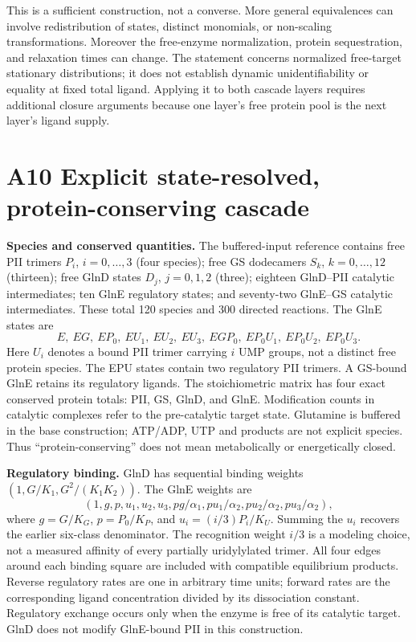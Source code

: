 \documentclass[11pt]{article}
\begin{document}
This is a sufficient construction, not a converse. More general equivalences can involve redistribution of states, distinct monomials, or non-scaling transformations. Moreover the free-enzyme normalization, protein sequestration, and relaxation times can change. The statement concerns normalized free-target stationary distributions; it does not establish dynamic unidentifiability or equality at fixed total ligand. Applying it to both cascade layers requires additional closure arguments because one layer's free protein pool is the next layer's ligand supply.

\section*{A10 Explicit state-resolved, protein-conserving cascade}

\textbf{Species and conserved quantities.} The buffered-input reference contains free PII trimers $P_i$, $i=0,\ldots,3$ (four species); free GS dodecamers $S_k$, $k=0,\ldots,12$ (thirteen); free GlnD states $D_j$, $j=0,1,2$ (three); eighteen GlnD--PII catalytic intermediates; ten GlnE regulatory states; and seventy-two GlnE--GS catalytic intermediates. These total 120 species and 300 directed reactions. The GlnE states are
\[
 E,\ EG,\ EP_0,\ EU_1,\ EU_2,\ EU_3,\ EGP_0,\ EP_0U_1,\ EP_0U_2,\ EP_0U_3.
\]
Here $U_i$ denotes a bound PII trimer carrying $i$ UMP groups, not a distinct free protein species. The EPU states contain two regulatory PII trimers. A GS-bound GlnE retains its regulatory ligands. The stoichiometric matrix has four exact conserved protein totals: PII, GS, GlnD, and GlnE. Modification counts in catalytic complexes refer to the pre-catalytic target state. Glutamine is buffered in the base construction; ATP/ADP, UTP and products are not explicit species. Thus ``protein-conserving'' does not mean metabolically or energetically closed.

\textbf{Regulatory binding.} GlnD has sequential binding weights $(1,G/K_1,G^2/(K_1K_2))$. The GlnE weights are
\[
 (1,g,p,u_1,u_2,u_3,pg/\alpha_1,pu_1/\alpha_2,pu_2/\alpha_2,pu_3/\alpha_2),
\]
where $g=G/K_G$, $p=P_0/K_P$, and $u_i=(i/3)P_i/K_U$. Summing the $u_i$ recovers the earlier six-class denominator. The recognition weight $i/3$ is a modeling choice, not a measured affinity of every partially uridylylated trimer. All four edges around each binding square are included with compatible equilibrium products. Reverse regulatory rates are one in arbitrary time units; forward rates are the corresponding ligand concentration divided by its dissociation constant. Regulatory exchange occurs only when the enzyme is free of its catalytic target. GlnD does not modify GlnE-bound PII in this construction.
\end{document}
